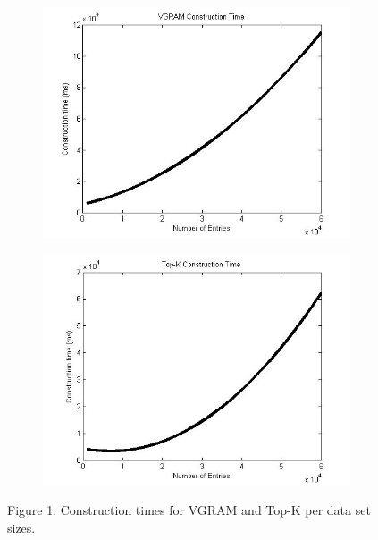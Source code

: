 \documentclass[pdftex,12pt,letter]{article}
\begin{document}
\begin{figure}[h!]
\centering
\begin{subfigure}[b]{0.45\textwidth}
\includegraphics[width=\textwidth]{VGRAMconstructionTime.jpg}
\label{fig:vgram}
\end{subfigure}
\begin{subfigure}[b]{0.45\textwidth}
\includegraphics[width=\textwidth]{TOPKconstructionTime.jpg}
\label{fig:topk}
\end{subfigure}
\begin{center}
Figure 1: Construction times for VGRAM and Top-K per data set sizes.
\end{center}
\end{figure}
\end{document}
